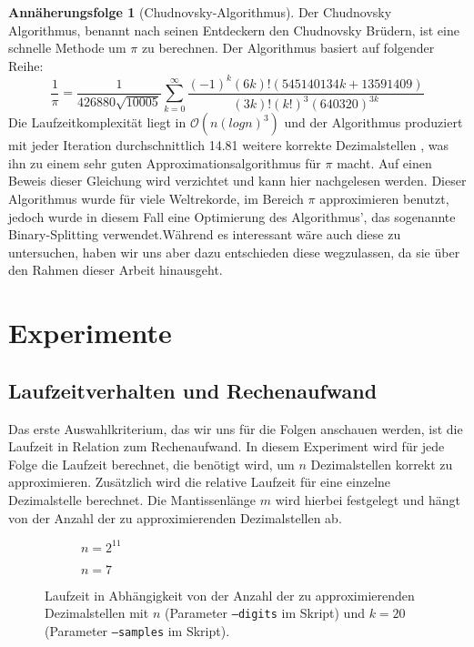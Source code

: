 \documentclass{scrartcl}
\theoremstyle{definition}
\newtheorem{approximation sequence}{Annäherungsfolge}
\begin{document}
\begin{approximation sequence}[Chudnovsky-Algorithmus]
Der Chudnovsky Algorithmus, benannt nach seinen Entdeckern den Chudnovsky Brüdern, ist eine schnelle Methode um \(\pi\) zu berechnen. 
Der Algorithmus basiert auf folgender Reihe\cite{Chudnovsky}:
\[\frac{1}{\pi} = \frac{1}{426880\sqrt{10005}}\sum_{k = 0}^{\infty}\frac{(-1)^k(6k)!(545140134k+13591409)}{(3k)!(k!)^3(640320)^{3k}}\]
Die Laufzeitkomplexität liegt in \(\mathcal{O}(n(logn)^3)\) \cite{Runtime-Chudnovsky} und der Algorithmus produziert mit jeder Iteration durchschnittlich
14.81 weitere korrekte Dezimalstellen \cite{Nachkommastellen-Chudnovsky}, was ihn zu einem sehr guten Approximationsalgorithmus für \(\pi\) macht.
Auf einen Beweis dieser Gleichung wird verzichtet und kann hier \cite{Chudnovsky-Proof} nachgelesen werden.
Dieser Algorithmus wurde für viele Weltrekorde, im Bereich \(\pi\) approximieren benutzt, jedoch wurde in diesem Fall eine Optimierung 
des Algorithmus', das sogenannte Binary-Splitting verwendet\cite{Chudnovsky}.Während es interessant wäre auch diese zu untersuchen, haben wir uns aber dazu
entschieden diese wegzulassen, da sie über den Rahmen dieser Arbeit hinausgeht.  

\end{approximation sequence}

\pagebreak

\section{Experimente}

\subsection{Laufzeitverhalten und Rechenaufwand}

Das erste Auswahlkriterium, das wir uns für die Folgen anschauen werden, ist
die Laufzeit in Relation zum Rechenaufwand. In diesem Experiment wird für jede
Folge die Laufzeit berechnet, die benötigt wird, um \(n\) Dezimalstellen
korrekt zu approximieren. Zusätzlich wird die relative Laufzeit für eine
einzelne Dezimalstelle berechnet. Die Mantissenlänge \(m\) wird hierbei
festgelegt und hängt von der Anzahl der zu approximierenden Dezimalstellen ab.

\begin{figure}[H]
    \centering
    \begin{subfigure}{\textwidth}
        \centering
        
        \caption{\(n = 2^{11}\)}
    \end{subfigure}
    \hfill
    \begin{subfigure}{\textwidth}
        \centering
        
        \caption{\(n = 7\)}
    \end{subfigure}
    \caption{%
        Laufzeit in Abhängigkeit von der Anzahl der zu approximierenden
        Dezimalstellen mit \(n\) (Parameter \texttt{--digits} im Skript)
        und \(k = 20\) (Parameter \texttt{--samples} im Skript).
    }
\end{figure}
\end{document}
